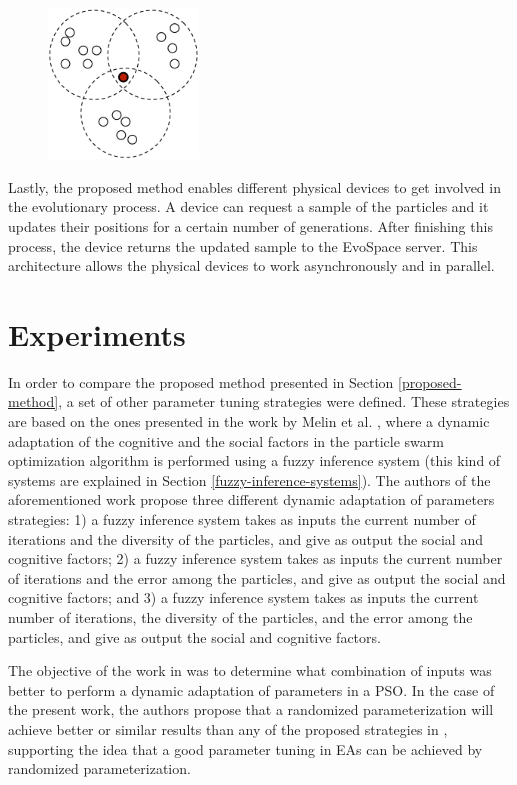 \begin{figure}
  \centering
  \includegraphics[height=4cm]{pdf/distributed-pso}
  \caption{}
  \label{distributed-pso}
\end{figure}

Lastly, the proposed method enables different physical devices to get
involved in the evolutionary process. A device can request a sample of
the particles and it updates their positions for a certain number of
generations. After finishing this process, the device returns the
updated sample to the EvoSpace server. This architecture allows the
physical devices to work asynchronously and in parallel.

\section{Experiments}
\label{experiments}

In order to compare the proposed method presented in Section \ref{proposed-method}, a set of other parameter tuning strategies were defined. These strategies are based on the ones presented in the work by Melin et al. \cite{melin2013optimal}, where a dynamic adaptation of the cognitive and the social factors in the particle swarm optimization algorithm is performed using a fuzzy inference system (this kind of systems are explained in Section \ref{fuzzy-inference-systems}). The authors of the aforementioned work propose three different dynamic adaptation of parameters strategies: 1) a fuzzy inference system takes as inputs the current number of iterations and the diversity of the particles, and give as output the social and cognitive factors; 2) a fuzzy inference system takes as inputs the current number of iterations and the error among the particles, and give as output the social and cognitive factors; and 3) a fuzzy inference system takes as inputs the current number of iterations, the diversity of the particles, and the error among the particles, and give as output the social and cognitive factors.

The objective of the work in \cite{melin2013optimal} was to determine what combination of inputs was better to perform a dynamic adaptation of parameters in a PSO. In the case of the present work, the authors propose that a randomized parameterization will achieve better or similar results than any of the proposed strategies in \cite{melin2013optimal}, supporting the idea that a good parameter tuning in EAs can be achieved by randomized parameterization.

